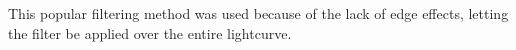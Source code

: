 This popular filtering method was used because of the lack of edge effects, letting the filter be applied over the entire lightcurve.